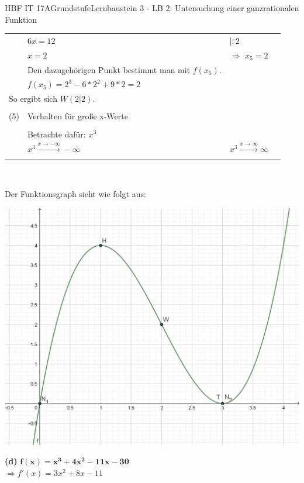 \documentclass[oneside,openany,headings=optiontotoc,11pt,numbers=noenddot]{scrreprt}
\begin{document}
\begin{worksheet}{HBF IT 17A}{Grundstufe}{Lernbaustein 3 - LB 2: Untersuchung einer ganzrationalen Funktion}
\begin{framed}
\begin{tabularx}{\textwidth}{lXXl}
				& \(6x = 12\) & |\(:2\)\\
				& \(x = 2\) & \(\Rightarrow\) \colorbox{green!10}{\(x_5 = 2\)}\\
				& Den dazugehörigen Punkt bestimmt man mit \(f(x_5)\).\\
				& \(f(x_5) = 2^3 -6*2^2 +9*2 = 2\)\\
				\multicolumn{2}{l}{So ergibt sich \colorbox{blue!5}{\(W(2|2)\)}.}\\
				\hline\hline\\
				(5) & Verhalten für große x-Werte\\
				\hline\\
				& Betrachte dafür: \(x^3\)\\
				& \colorbox{green!10}{\(x^3\xrightarrow{x\rightarrow-\infty}-\infty\)} & \colorbox{green!10}{\(x^3\xrightarrow{x\rightarrow\infty}\infty\)}\\
				\hline\hline\\
			\end{tabularx}\\
			\par\noindent
			Der Funktionsgraph sieht wie folgt aus:\\
			\par
			\includegraphics[scale=0.4]{Bilder/HAc.png}
		\end{framed}
		\newpage
		\begin{framed}
			\noindent
			\textbf{(d)} \(\mathbf{f(x) = x^3 +4x^2-11x-30}\)\\
			\(\Rightarrow f'(x) = 3x^2 +8x-11\)\\

\end{framed}
\end{worksheet}
\end{document}
